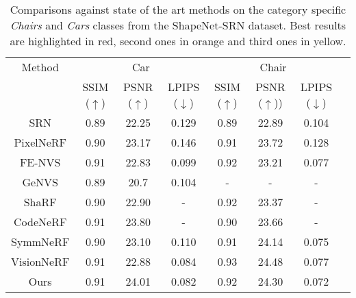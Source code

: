 \begin{table}[htp!]
\caption{Comparisons against state of the art methods on the category specific \textit{Chairs} and \textit{Cars} classes from the ShapeNet-SRN dataset. Best results are highlighted in red, second ones in orange and third ones in yellow. }
\label{table:comp_res}
\centering%
\begin{adjustbox}{height=2.3cm}
\begin{tabular}[h]{c||ccccccc}
\hline
 Method & \multicolumn{3}{c}{Car} & \multicolumn{3}{c}{Chair} \\
 &  SSIM ($\uparrow$) & PSNR ($\uparrow$) & LPIPS ($\downarrow$) & SSIM ($\uparrow$) & PSNR ($\uparrow$)) & LPIPS ($\downarrow$)\\
\hline
SRN \cite{SRN}& \cellcolor{yellow!25}0.89 & 22.25 & 0.129 & 0.89 & 22.89 & 0.104\\
PixelNeRF \cite{pixelnerf} & \cellcolor{orange!25}0.90 & 23.17 & 0.146 & \cellcolor{yellow!25}0.91 & 23.72 & 0.128\\
FE-NVS \cite{guo2022fast} & \cellcolor{red!25}0.91 & 22.83 & \cellcolor{yellow!25}0.099 & \cellcolor{orange!25}0.92 & 23.21 & 0.077 \\
GeNVS\cite{chan2023generative}& \cellcolor{yellow!25}0.89 & 20.7 & 0.104 & - & - & - \\
ShaRF \cite{codenerf} & \cellcolor{orange!25}0.90 & 22.90 & - & \cellcolor{orange!25}0.92 & 23.37 & - \\
CodeNeRF \cite{codenerf} & \cellcolor{red!25}0.91 & \cellcolor{orange!25}23.80 & - & 0.90 & 23.66 & -  \\
SymmNeRF\footnotemark\cite{symmnerf}& \cellcolor{orange!25}0.90 & \cellcolor{yellow!25}23.10 & 0.110 & \cellcolor{yellow!25}0.91 & \cellcolor{yellow!25}24.14  & \cellcolor{orange!25}0.075 \\
VisionNeRF \cite{visionnerf} & \cellcolor{red!25}0.91 & 22.88 & \cellcolor{orange!25}0.084 & \cellcolor{red!25}0.93 & \cellcolor{red!25}24.48  & \cellcolor{yellow!25}0.077 \\
Ours &\cellcolor{red!25} 0.91 & \cellcolor{red!25}24.01 &\cellcolor{red!25} 0.082 &  \cellcolor{orange!25} 0.92 & \cellcolor{orange!25}24.30 & \cellcolor{red!25}0.072 \\

\hline 
\end{tabular}
\end{adjustbox}
\end{table}

